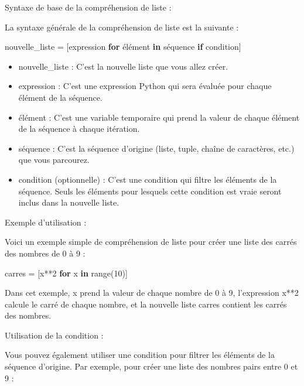 \documentclass[11pt]{article}
\providecommand{\tightlist}{%
      \setlength{\itemsep}{0pt}\setlength{\parskip}{0pt}}
\newenvironment{Shaded}{}{}
\newcommand{\KeywordTok}[1]{\textcolor[rgb]{0.00,0.44,0.13}{\textbf{{#1}}}}
\newcommand{\DecValTok}[1]{\textcolor[rgb]{0.25,0.63,0.44}{{#1}}}
\newcommand{\NormalTok}[1]{{#1}}
\newcommand{\ControlFlowTok}[1]{\textcolor[rgb]{0.00,0.44,0.13}{\textbf{{#1}}}}
\newcommand{\OperatorTok}[1]{\textcolor[rgb]{0.40,0.40,0.40}{{#1}}}
\newcommand{\BuiltInTok}[1]{{#1}}
\begin{document}
Syntaxe de base de la compréhension de liste :

La syntaxe générale de la compréhension de liste est la suivante :

\begin{Shaded}
\begin{Highlighting}[]
\NormalTok{nouvelle\_liste }\OperatorTok{=}\NormalTok{ [expression }\ControlFlowTok{for}\NormalTok{ élément }\KeywordTok{in}\NormalTok{ séquence }\ControlFlowTok{if}\NormalTok{ condition]}
\end{Highlighting}
\end{Shaded}

\begin{itemize}
\tightlist
\item
  nouvelle\_liste : C'est la nouvelle liste que vous allez créer.
\item
  expression : C'est une expression Python qui sera évaluée pour chaque
  élément de la séquence.
\item
  élément : C'est une variable temporaire qui prend la valeur de chaque
  élément de la séquence à chaque itération.
\item
  séquence : C'est la séquence d'origine (liste, tuple, chaîne de
  caractères, etc.) que vous parcourez.
\item
  condition (optionnelle) : C'est une condition qui filtre les éléments
  de la séquence. Seuls les éléments pour lesquels cette condition est
  vraie seront inclus dans la nouvelle liste.
\end{itemize}

Exemple d'utilisation :

Voici un exemple simple de compréhension de liste pour créer une liste
des carrés des nombres de 0 à 9 :

\begin{Shaded}
\begin{Highlighting}[]
\NormalTok{carres }\OperatorTok{=}\NormalTok{ [x}\OperatorTok{**}\DecValTok{2} \ControlFlowTok{for}\NormalTok{ x }\KeywordTok{in} \BuiltInTok{range}\NormalTok{(}\DecValTok{10}\NormalTok{)]}
\end{Highlighting}
\end{Shaded}

Dans cet exemple, x prend la valeur de chaque nombre de 0 à 9,
l'expression x**2 calcule le carré de chaque nombre, et la nouvelle
liste carres contient les carrés des nombres.

Utilisation de la condition :

Vous pouvez également utiliser une condition pour filtrer les éléments
de la séquence d'origine. Par exemple, pour créer une liste des nombres
pairs entre 0 et 9 :
\end{document}
